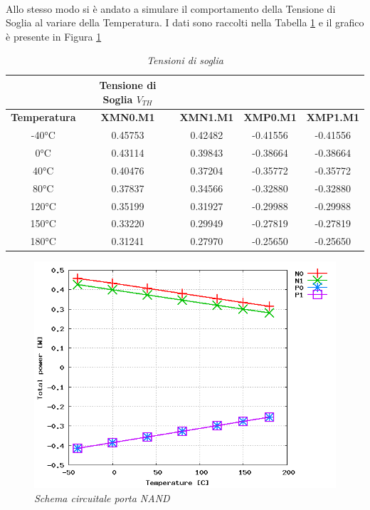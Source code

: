 \\
Allo stesso modo si è andato a simulare il comportamento della Tensione di Soglia al variare della Temperatura. I dati sono raccolti nella Tabella \ref{Tab5_24} e il grafico è presente in Figura \ref{TEMPVT}
\begin{table}[!h]\footnotesize
	\centering
	\begin{tabular}{|c|cccc|}
		\hline
		&\textbf{Tensione di Soglia} \textbf{$V_{TH}$}&&&\\
		\hline
		\textbf{Temperatura}&\textbf{XMN0.M1}&\textbf{XMN1.M1}&\textbf{XMP0.M1}&\textbf{XMP1.M1}\\
		\hline
		-40°C&0.45753&0.42482&-0.41556&-0.41556\\
		0°C&0.43114&0.39843&-0.38664&-0.38664\\
		40°C&0.40476&0.37204&-0.35772&-0.35772\\
		80°C&0.37837&0.34566&-0.32880&-0.32880\\
		120°C&0.35199&0.31927&-0.29988&-0.29988\\
		150°C&0.33220&0.29949&-0.27819&-0.27819\\
		180°C&0.31241&0.27970&-0.25650&-0.25650\\
		\hline
	\end{tabular}
	\caption{\textit{Tensioni di soglia}}
	\label{Tab5_24}
\end{table}
\begin{figure}[!htb]
	\centering
	\includegraphics[scale=0.55]{immagini/TEMPVT}
	\caption{\textit{Schema circuitale porta NAND}}
	\label{TEMPVT}
\end{figure}

